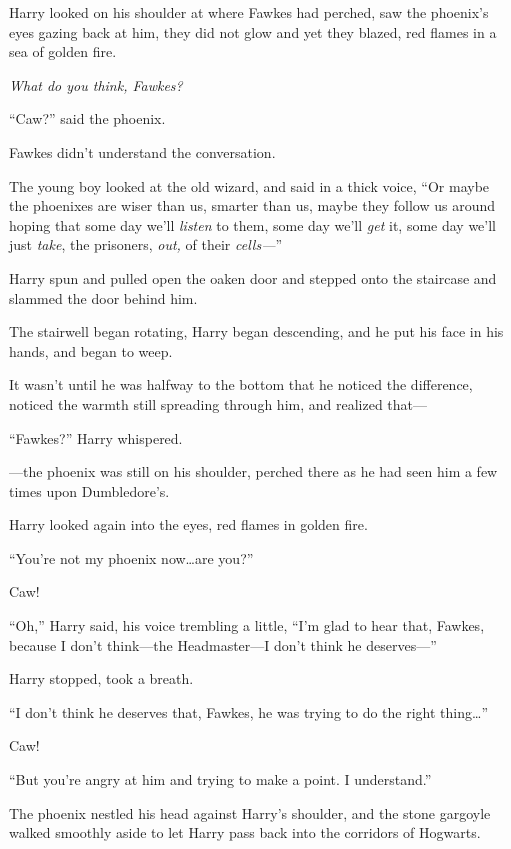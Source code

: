 Harry looked on his shoulder at where Fawkes had perched, saw the phoenix’s
eyes gazing back at him, they did not glow and yet they blazed, red flames in a
sea of golden fire.

\emph{What do you think, Fawkes?}

“Caw?” said the phoenix.

Fawkes didn’t understand the conversation.

The young boy looked at the old wizard, and said in a thick voice, “Or maybe
the phoenixes are wiser than us, smarter than us, maybe they follow us around
hoping that some day we’ll \emph{listen} to them, some day we’ll \emph{get} it,
some day we’ll just \emph{take}, the prisoners, \emph{out,} of their
\emph{cells—}”

Harry spun and pulled open the oaken door and stepped onto the staircase and
slammed the door behind him.

The stairwell began rotating, Harry began descending, and he put his face in
his hands, and began to weep.

It wasn’t until he was halfway to the bottom that he noticed the difference,
noticed the warmth still spreading through him, and realized that—

“Fawkes?” Harry whispered.

—the phoenix was still on his shoulder, perched there as he had seen him a
few times upon Dumbledore’s.

Harry looked again into the eyes, red flames in golden fire.

“You’re not my phoenix now…are you?”

Caw!

“Oh,” Harry said, his voice trembling a little, “I’m glad to hear that, Fawkes,
because I don’t think—the Headmaster—I don’t think he deserves—”

Harry stopped, took a breath.

“I don’t think he deserves that, Fawkes, he was trying to do the right
thing…”

Caw!

“But you’re angry at him and trying to make a point. I understand.”

The phoenix nestled his head against Harry’s shoulder, and the stone gargoyle
walked smoothly aside to let Harry pass back into the corridors of Hogwarts.

